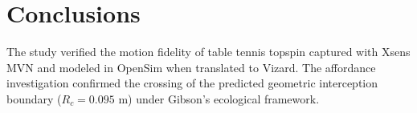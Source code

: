 \section{Conclusions}
The study verified the motion fidelity of table tennis topspin captured with Xsens MVN and modeled in OpenSim when translated to Vizard. The affordance investigation confirmed the crossing of the predicted geometric interception boundary ($R_c = 0.095\text{ m}$) under Gibson's ecological framework.
